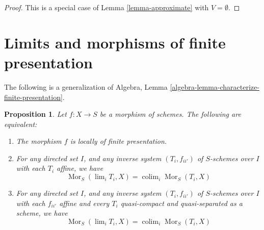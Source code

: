 \documentclass{stacks-project}
\newenvironment{reference}{\comment}{\endcomment}
\theoremstyle{plain}
\newtheorem{proposition}[subsection]{Proposition}
\theoremstyle{definition}
\theoremstyle{remark}
\numberwithin{equation}{subsection}
\def\lim{\mathop{\mathrm{lim}}\nolimits}
\def\colim{\mathop{\mathrm{colim}}\nolimits}
\def\Mor{\mathop{\mathrm{Mor}}\nolimits}
\begin{document}
\begin{proof}
This is a special case of Lemma \ref{lemma-approximate}
with $V = \emptyset$.
\end{proof}






\section{Limits and morphisms of finite presentation}
\label{section-finite-presentation}

\noindent
The following is a generalization of
Algebra, Lemma \ref{algebra-lemma-characterize-finite-presentation}.

\begin{proposition}
\label{proposition-characterize-locally-finite-presentation}
\begin{reference}
\cite[IV, Proposition 8.14.2]{EGA}
\end{reference}
Let $f : X \to S$ be a morphism of schemes.
The following are equivalent:
\begin{enumerate}
\item The morphism $f$ is locally of finite presentation.
\item For any directed set $I$, and any
inverse system $(T_i, f_{ii'})$ of $S$-schemes over $I$
with each $T_i$ affine, we have
$$
\Mor_S(\lim_i T_i, X) =
\colim_i \Mor_S(T_i, X)
$$
\item For any directed set $I$, and any
inverse system $(T_i, f_{ii'})$ of $S$-schemes over $I$
with each $f_{ii'}$ affine and every $T_i$ quasi-compact and
quasi-separated as a scheme, we have
$$
\Mor_S(\lim_i T_i, X) =
\colim_i \Mor_S(T_i, X)
$$
\end{enumerate}
\end{proposition}
\end{document}
